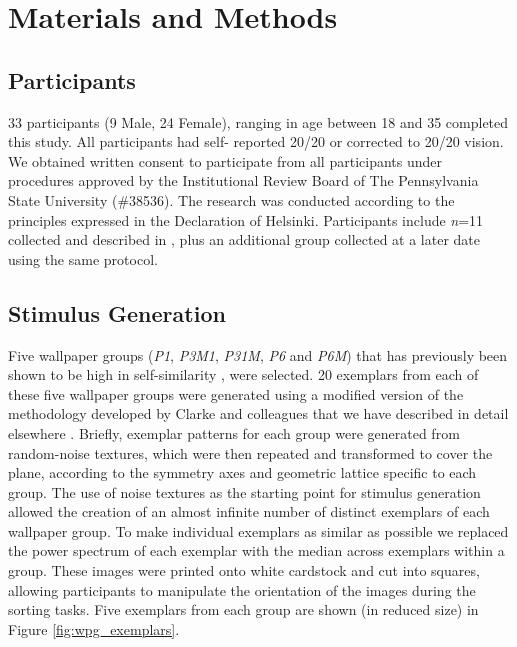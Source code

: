 \documentclass[11pt, twoside]{article}
\begin{document}
\section*{Materials and Methods}
\label{methods}

\subsection*{Participants}
33 participants (9 Male, 24 Female), ranging in age between 18 and 35 completed this study. All participants had self- reported 20/20 or corrected to 20/20 vision. We obtained written consent to participate from all participants under procedures approved by the Institutional Review Board of The Pennsylvania State University (\#38536). The research was conducted according to the principles expressed in the Declaration of Helsinki. Participants include \textit{n}=11 collected and described in \citep{vedak_thesis}, plus an additional group collected at a later date using the same protocol.

\subsection*{Stimulus Generation}
Five wallpaper groups (\textit{P1}, \textit{P3M1}, \textit{P31M}, \textit{P6} and \textit{P6M}) that has previously been shown to be high in self-similarity \citep{RN172}, were selected. 20 exemplars from each of these five wallpaper groups were generated using a modified version of the methodology developed by Clarke and colleagues \citep{RN172} that we have described in detail elsewhere \citep{RN1725}. Briefly, exemplar patterns for each group were generated from random-noise textures, which were then repeated and transformed to cover the plane, according to the symmetry axes and geometric lattice specific to each group. The use of noise textures as the starting point for stimulus generation allowed the creation of an almost infinite number of distinct exemplars of each wallpaper group. To make individual exemplars as similar as possible we replaced the power spectrum of each exemplar with the median across exemplars within a group. These images were printed onto white cardstock and cut into squares, allowing participants to manipulate the orientation of the images during the sorting tasks. Five exemplars from each group are shown (in reduced size) in Figure \ref{fig:wpg_exemplars}. 
\end{document}
